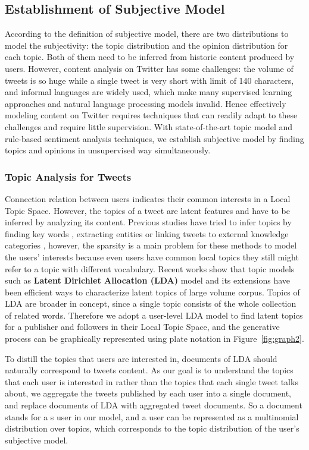 \documentclass{acm_proc_article-sp}
\begin{document}
\subsection{Establishment of Subjective Model}
\label{concrete}
According to the definition of subjective model, there are two distributions to model the subjectivity: the topic distribution and the opinion distribution for each topic. Both of them need to be inferred from historic content produced by users.
However, content analysis on Twitter has some challenges: the volume of tweets is so huge while a single tweet is very short with limit of 140 characters, and informal languages are widely used, which make many supervised learning approaches and natural language processing models invalid. 
Hence effectively modeling content on Twitter requires techniques that can readily adapt to these challenges and require little supervision.
With state-of-the-art topic model and rule-based sentiment analysis techniques, we establish subjective model by finding topics and opinions in unsupervised way simultaneously. 
\subsubsection{Topic Analysis for Tweets}
\label{local}
Connection relation between users indicates their common interests in a Local Topic Space. 
However, the topics of a tweet are latent features and have to be inferred by analyzing its content.
Previous studies have tried to infer topics by finding key words \cite{Chen:2010STE}, extracting  entities \cite{Abel:2011AUM} or linking tweets to external knowledge categories \cite{conf/icwsm/MacskassyM11}, however, the sparsity is a main problem for these methods to model the users' interests because even users have common local topics they still might refer to a topic with different vocabulary.
Recent works show that topic models such as \textbf{Latent Dirichlet Allocation (LDA)} model and its extensions\cite{blei2003latent,conf/wsdm/WengLJH10} have been efficient ways to characterize latent topics of large volume corpus.  
Topics of LDA are broader in concept, since a single topic consists of the whole collection of related words. 
Therefore we adopt a user-level LDA model to find latent topics for a publisher and followers in their Local Topic Space, and the generative process can be graphically represented using plate notation in Figure~\ref{fig:graph2}.

To distill the topics that users are interested in, documents of LDA should naturally correspond to tweets content. 
As our goal is to understand the topics that each user is interested in rather than the topics that each single tweet talks about, we aggregate the tweets published by each user into a single document, and replace documents of LDA with aggregated tweet documents. 
So a document stands for a s user in our model, and a user can be represented as a multinomial distribution over topics, which corresponds to the topic distribution of the user's subjective model.
 
\end{document}
